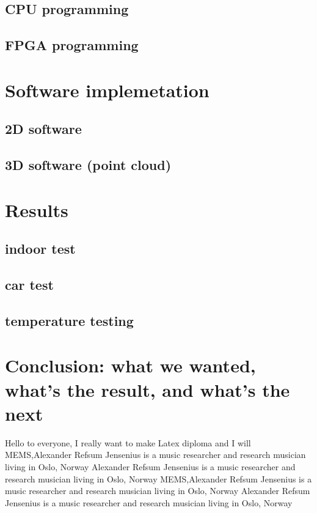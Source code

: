 \section{CPU programming}
\section{FPGA programming}

\chapter{Software implemetation}
\section{2D software}
\section{3D software (point cloud)}




\chapter{Results}
\section{indoor test}
\section{car test}
\section{temperature testing}
\chapter{Conclusion: what we wanted, what's the result, and what's the next}








\label{my_desire}
Hello to everyone, I really want to make
Latex diploma and I will
MEMS,Alexander Refsum Jensenius is a music researcher and research musician living in Oslo, Norway Alexander Refsum Jensenius is a music researcher and research musician living in Oslo, Norway
MEMS,Alexander Refsum Jensenius is a music researcher and research musician living in Oslo, Norway Alexander Refsum Jensenius is a music researcher and research musician living in Oslo, Norway

